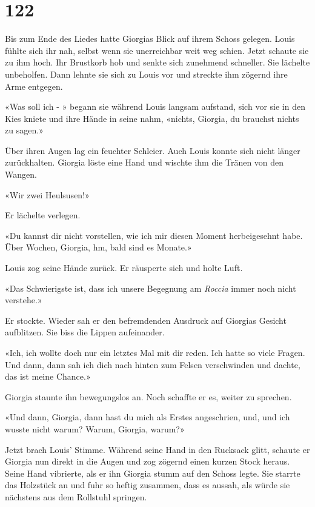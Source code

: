 \chapter{122}



Bis zum Ende des Liedes hatte Giorgias Blick auf ihrem Schoss gelegen.
Louis fühlte sich ihr nah, selbst wenn sie unerreichbar weit weg schien.
Jetzt schaute sie zu ihm hoch. Ihr Brustkorb hob und senkte sich
zunehmend schneller. Sie lächelte unbeholfen. Dann lehnte sie sich zu
Louis vor und streckte ihm zögernd ihre Arme entgegen.

«Was soll ich - » begann sie während Louis langsam aufstand, sich vor sie
in den Kies kniete und ihre Hände in seine nahm, «nichts, Giorgia, du
brauchst nichts zu sagen.»

Über ihren Augen lag ein feuchter Schleier. Auch Louis konnte sich nicht
länger zurückhalten.
Giorgia löste eine Hand und wischte ihm die Tränen von den Wangen.

«Wir zwei Heulsusen!»

Er lächelte verlegen.

«Du kannst dir nicht vorstellen, wie ich mir diesen Moment herbeigesehnt
habe. Über Wochen, Giorgia, hm, bald sind es Monate.»

Louis zog seine Hände zurück. Er räusperte sich und holte Luft.

«Das Schwierigste ist, dass ich unsere Begegnung am \emph{Roccia} immer
noch nicht verstehe.»

Er stockte. Wieder sah er den befremdenden Ausdruck auf Giorgias
Gesicht aufblitzen. Sie biss die Lippen aufeinander.

«Ich, ich wollte doch nur ein letztes Mal mit dir reden. Ich hatte so
viele Fragen. Und dann, dann sah ich dich nach hinten zum Felsen
verschwinden und dachte, das ist meine Chance.»

Giorgia staunte ihn bewegungslos an. Noch schaffte er es, weiter zu sprechen.

«Und dann, Giorgia, dann hast du mich als Erstes angeschrien, und, und
ich wusste nicht warum? Warum, Giorgia, warum?»

Jetzt brach Louis’ Stimme. Während seine Hand in den Rucksack glitt, schaute er Giorgia nun direkt in die Augen und zog zögernd einen kurzen Stock heraus. Seine Hand vibrierte, als er ihn Giorgia stumm auf den Schoss legte. Sie starrte das
Holzstück an und fuhr so heftig zusammen, dass es aussah, als würde
sie nächstens aus dem Rollstuhl springen.

